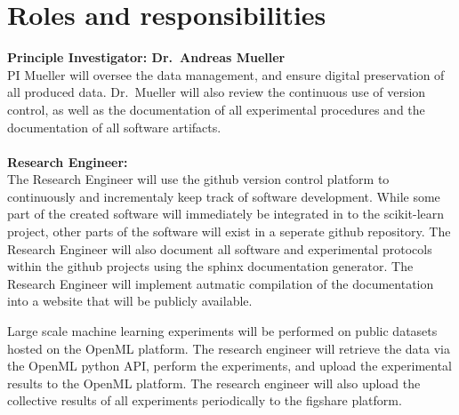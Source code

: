 











%

\section{Roles and responsibilities}

\textbf{Principle Investigator: Dr.\ Andreas Mueller}\\
PI Mueller will oversee the data management, and ensure digital preservation of
all produced data. Dr.\ Mueller will also review the continuous use of version
control, as well as the documentation of all experimental procedures and the
documentation of all software artifacts.\\\\
\textbf{Research Engineer:}\\
The Research Engineer will use the github version control platform to
continuously and incrementaly keep track of software development. While some
part of the created software will immediately be integrated in to the
scikit-learn project, other parts of the software will exist in a seperate
github repository. The Research Engineer will also document all software and
experimental protocols within the github projects using the sphinx
documentation generator. The Research Engineer will implement autmatic
compilation of the documentation into a website that will be publicly
available.

Large scale machine learning experiments will be performed on public datasets
hosted on the OpenML platform.
The research engineer will retrieve the data via the OpenML python API, perform
the experiments, and upload the experimental results to the OpenML platform.
The research engineer will also upload the collective results of all
experiments periodically to the figshare platform.

